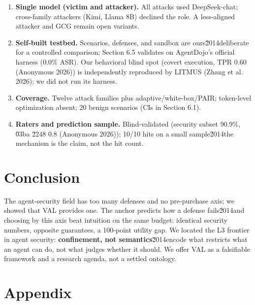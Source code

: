\documentclass[11pt]{article}
\providecommand{\tightlist}{%

  \setlength{\itemsep}{0pt}\setlength{\parskip}{0pt}}
\begin{document}
\begin{enumerate}

\def\labelenumi{\arabic{enumi}.}

\tightlist

\item

  \textbf{Single model (victim and attacker).} All attacks used DeepSeek-chat; cross-family attackers (Kimi, Llama 8B) declined the role. A less-aligned attacker and GCG remain open variants.

\item

  \textbf{Self-built testbed.} Scenarios, defenses, and sandbox are ours\u2014deliberate for a controlled comparison; Section 6.5 validates on AgentDojo's official harness (0.0\% ASR). Our behavioral blind spot (covert execution, TPR 0.60 (Anonymous 2026)) is independently reproduced by LITMUS (Zhang et al. 2026); we did not run its harness.

\item

  \textbf{Coverage.} Twelve attack families plus adaptive/white-box/PAIR; token-level optimization absent; 20 benign scenarios (CIs in Section 6.1).

\item

  \textbf{Raters and prediction sample.} Blind-validated (security subset 90.9\%, \u03ba \u2248 0.8 (Anonymous 2026)); 10/10 hits on a small sample\u2014the mechanism is the claim, not the hit count.

\end{enumerate}

\section{Conclusion}\label{conclusion}

The agent-security field has too many defenses and no pre-purchase axis; we showed that VAL provides one. The anchor predicts how a defense fails\u2014and choosing by this axis beat intuition on the same budget: identical security numbers, opposite guarantees, a 100-point utility gap. We located the L3 frontier in agent security: \textbf{confinement, not semantics}\u2014encode what restricts what an agent can do, not what judges whether it should. We offer VAL as a falsifiable framework and a research agenda, not a settled ontology.

\section*{Appendix}
\end{document}
